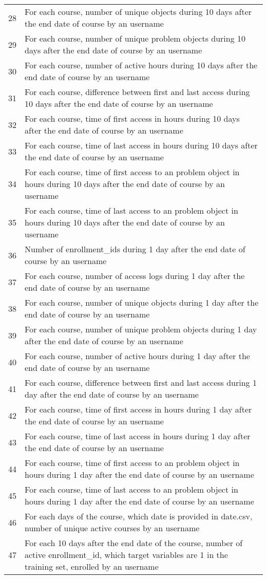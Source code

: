 \begin{center}
\begin{table*}[ht]
\begin{minipage}{\textwidth}
{\begin{tabular}{|l|l|}
      28 & For each course, number of unique objects during 10 days after the end date of course by an username \tabularnewline
      29 & For each course, number of unique problem objects during 10 days after the end date of course by an username \tabularnewline
      30 & For each course, number of active hours during 10 days after the end date of course by an username \tabularnewline
      31 & For each course, difference between first and last access during 10 days after the end date of course by an username \tabularnewline
      32 & For each course, time of first access in hours during 10 days after the end date of course by an username \tabularnewline
      33 & For each course, time of last access in hours during 10 days after the end date of course by an username \tabularnewline
      34 & For each course, time of first access to an problem object in hours during 10 days after the end date of course by an username \tabularnewline
      35 & For each course, time of last access to an problem object in hours during 10 days after the end date of course by an username \tabularnewline
      36 & Number of enrollment\_ids during 1 day after the end date of course by an username \tabularnewline
      37 & For each course, number of access logs during 1 day after the end date of course by an username \tabularnewline
      38 & For each course, number of unique objects during 1 day after the end date of course by an username \tabularnewline
      39 & For each course, number of unique problem objects during 1 day after the end date of course by an username \tabularnewline
      40 & For each course, number of active hours during 1 day after the end date of course by an username \tabularnewline
      41 & For each course, difference between first and last access during 1 day after the end date of course by an username \tabularnewline
      42 & For each course, time of first access in hours during 1 day after the end date of course by an username \tabularnewline
      43 & For each course, time of last access in hours during 1 day after the end date of course by an username \tabularnewline
      44 & For each course, time of first access to an problem object in hours during 1 day after the end date of course by an username \tabularnewline
      45 & For each course, time of last access to an problem object in hours during 1 day after the end date of course by an username \tabularnewline
      46 & For each days of the course, which date is provided in date.csv, number of unique active courses by an username \tabularnewline
      47 & For each 10 days after the end date of the course, number of active enrollment\_id, which target variables are 1 in the training set, enrolled by an username \tabularnewline 

\end{tabular}}
\end{minipage}
\end{table*}
\end{center}
